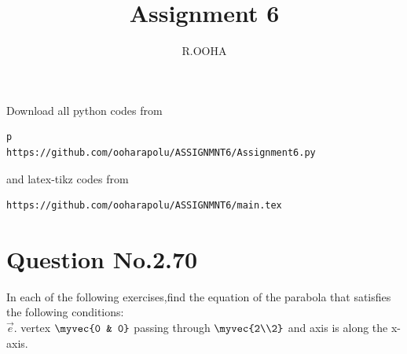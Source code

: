 \documentclass[journal,12pt,twocolumn]{IEEEtran}
\begin{document}
     \def\rightbox#1{\makebox[0in][r]{#1}}
     \def\centbox#1{\makebox[0in]{#1}}
     \def\topbox#1{\raisebox{-\baselineskip}[0in][0in]{#1}}
     \def\midbox#1{\raisebox{-0.5\baselineskip}[0in][0in]{#1}}
\vspace{3cm}
\title{Assignment 6}
\author{R.OOHA}
\maketitle
\newpage
\bigskip
\renewcommand{\thefigure}{\theenumi}
\renewcommand{\thetable}{\theenumi}
Download all python codes from 
\begin{lstlisting}p
https://github.com/ooharapolu/ASSIGNMNT6/Assignment6.py
\end{lstlisting}
%
and latex-tikz codes from 
%
\begin{lstlisting}
https://github.com/ooharapolu/ASSIGNMNT6/main.tex
\end{lstlisting}
%
\section{Question No.2.70}
In each of the following exercises,find the equation of the parabola that satisfies the following conditions:\\ $\vec{e}$. vertex $\myvec{0 & 0}$ passing through $\myvec{2\\2}$ and axis is along the x-axis.
%
\end{document}
